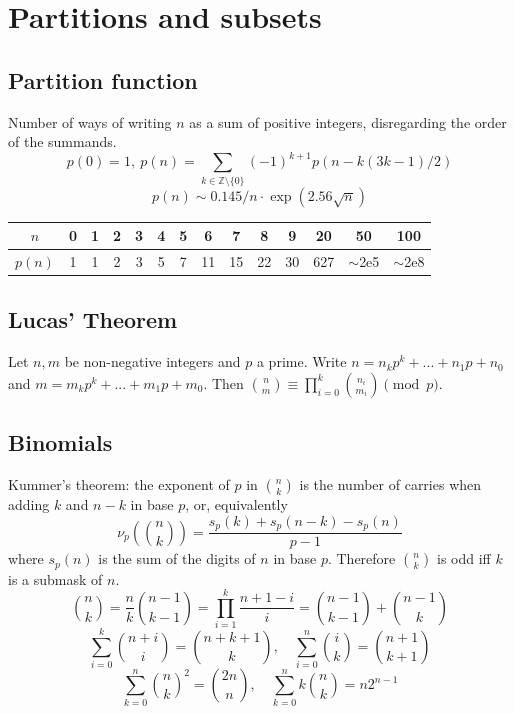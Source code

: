 \section{Partitions and subsets}
	\subsection{Partition function}
		Number of ways of writing $n$ as a sum of positive integers, disregarding the order of the summands.
		\[ p(0) = 1,\ p(n) = \sum_{k \in \mathbb Z \setminus \{0\}}{(-1)^{k+1} p(n - k(3k-1) / 2)} \]
		\[ p(n) \sim 0.145 / n \cdot \exp(2.56 \sqrt{n}) \]

		\begin{center}
		\begin{tabular}{c|c@{\ }c@{\ }c@{\ }c@{\ }c@{\ }c@{\ }c@{\ }c@{\ }c@{\ }c@{\ }c@{\ }c@{\ }c}
			$n$    & 0 & 1 & 2 & 3 & 4 & 5 & 6  & 7  & 8  & 9  & 20  & 50  & 100 \\ \hline
			$p(n)$ & 1 & 1 & 2 & 3 & 5 & 7 & 11 & 15 & 22 & 30 & 627 & $\mathtt{\sim}$2e5 & $\mathtt{\sim}$2e8 \\
		\end{tabular}
		\end{center}

	\subsection{Lucas' Theorem}
		Let $n,m$ be non-negative integers and $p$ a prime. Write $n=n_kp^k+...+n_1p+n_0$ and $m=m_kp^k+...+m_1p+m_0$. Then $\binom{n}{m} \equiv \prod_{i=0}^k\binom{n_i}{m_i} \pmod{p}$.

	\subsection{Binomials}
		Kummer's theorem: the exponent of $p$ in $\binom{n}{k}$ is the number of carries when adding $k$ and $n-k$ in base $p$, or, equivalently
		\[ \nu_{p}\left(\binom{n}{k}\right) = \frac{s_p(k)+s_p(n-k)-s_p(n)}{p-1} \]
		where $s_p(n)$ is the sum of the digits of $n$ in base $p$. Therefore $\binom{n}{k}$ is odd iff $k$ is a submask of $n$.
		\[ \binom{n}{k} = \frac{n}{k} \binom{n-1}{k-1} = \prod_{i=1}^{k} \frac{n+1-i}{i} = \binom{n-1}{k-1} + \binom{n-1}{k} \]
		\[ \sum_{i=0}^{k} \binom{n+i}{i} = \binom{n+k+1}{k}, \quad \sum_{i=0}^{n} \binom{i}{k} = \binom{n+1}{k+1} \]
		\[ \sum_{k=0}^{n} \binom{n}{k}^2 = \binom{2n}{n}, \quad \sum_{k=0}^{n} k \binom{n}{k} = n2^{n-1} \]


